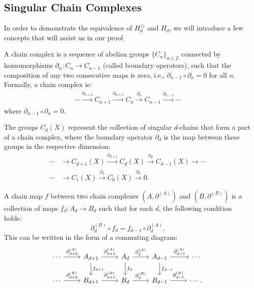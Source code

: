 \subsection{Singular Chain Complexes}
\label{SingularChainComplexes}
In order to demonstrate the equivalence of \( H_{d}^{\triangle} \) and \( H_{d} \), we will introduce a few concepts that will assist us in our proof.

\begin{definition}
	\label{ChainComplex}
	A chain complex is a sequence of abelian groups \(\{C_n\}_{n \in \mathbb{Z}}\) connected by homomorphisms \(\partial_n: C_n \to C_{n-1}\) (called boundary operators), such that the composition of any two consecutive maps is zero, i.e., \(\partial_{n-1} \circ \partial_n = 0\) for all \(n\). Formally, a chain complex is:
	\begin{align}
		\cdots \xrightarrow{\partial_{n+2}} C_{n+1} \xrightarrow{\partial_{n+1}} C_n \xrightarrow{\partial_n} C_{n-1} \xrightarrow{\partial_{n-1}} \cdots 
	\end{align}
	where \(\partial_{n-1} \circ \partial_n = 0\).
\end{definition}

\begin{example}
	The groups $C_{d}(X)$ represent the collection of singular $d$-chains that form
	a part of a chain complex, where the boundary operator $\partial_{d}$ is the map between these groups in the respective dimension:
	\begin{align}
		\cdots &\xrightarrow{}C_{d+1}(X) \xrightarrow{\partial_{d+1}} C_{d}(X) \xrightarrow{\partial_d}C_{d-1}(X) \xrightarrow{}\cdots \\
		\cdots &\xrightarrow{}C_{1}(X) \xrightarrow{\partial_1} C_{0}(X) \xrightarrow{\partial_0}0.                              
	\end{align}
\end{example}

\begin{definition}
	A chain map $f$ between two chain complexes $(A, \partial^{(A)})$ and $(B,\partial
	^{(B)})$ is a collection of maps $f_{d}: A_{d} \rightarrow B_{d}$ such that for
	each $d$, the following condition holds:
	\begin{equation}
		\partial^{(B)}_{d}\circ f_{d} = f_{d-1}\circ \partial^{(A)}_{d}.
	\end{equation}
	This can be written in the form of a commuting diagram:
	\begin{equation}
		\begin{tikzcd}
			\cdots \arrow[r, "\partial^{(A)}_{d+2}"] & A_{d+1} \arrow[r, "\partial^{(A)}_{d+1}"]
			\arrow[d, "f_{d+1}"] & A_d \arrow[r, "\partial^{(A)}_{d}"] \arrow[d, "f_d"]
			& A_{d-1} \arrow[r, "\partial^{(A)}_{d-1}"] \arrow[d, "f_{d-1}"] & \cdots \\
			\cdots \arrow[r, "\partial^{(B)}_{d+2}"] & B_{d+1} \arrow[r, "\partial^{(B)}_{d+1}"]
			& B_d \arrow[r, "\partial^{(B)}_d"] & B_{d-1} \arrow[r, "\partial^{(B)}_{d-1}"]
			& \cdots.
		\end{tikzcd}
	\end{equation}
\end{definition}

